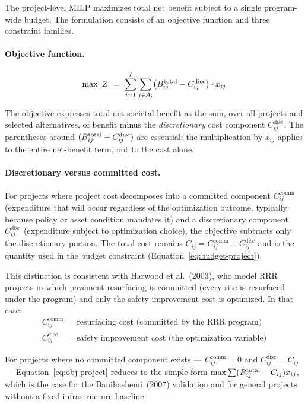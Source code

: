 The project-level MILP maximizes total net benefit subject to a single
program-wide budget. The formulation consists of an objective function and
three constraint families.

\paragraph{Objective function.}
\begin{equation}
\max\ Z\ =\ \sum_{i=1}^{I} \sum_{j \in A_i} \bigl( B^{\mathrm{total}}_{ij} - C_{ij}^{\mathrm{disc}} \bigr) \cdot x_{ij}
\label{eq:obj-project}
\end{equation}

The objective expresses total net societal benefit as the sum, over all
projects and selected alternatives, of benefit minus the
\emph{discretionary} cost component $C_{ij}^{\mathrm{disc}}$. The
parentheses around $(B^{\mathrm{total}}_{ij} - C_{ij}^{\mathrm{disc}})$ are essential:
the multiplication by $x_{ij}$ applies to the entire net-benefit term,
not to the cost alone.

\paragraph{Discretionary versus committed cost.} For projects where
project cost decomposes into a committed component $C_{ij}^{\mathrm{comm}}$
(expenditure that will occur regardless of the optimization outcome,
typically because policy or asset condition mandates it) and a
discretionary component $C_{ij}^{\mathrm{disc}}$ (expenditure subject to
optimization choice), the objective subtracts only the discretionary
portion. The total cost remains $C_{ij} = C_{ij}^{\mathrm{comm}} +
C_{ij}^{\mathrm{disc}}$ and is the quantity used in the budget
constraint (Equation~\ref{eq:budget-project}).

This distinction is consistent with Harwood et al.~(2003), who model
RRR projects in which pavement resurfacing is committed (every site is
resurfaced under the program) and only the safety improvement cost is
optimized. In that case:
\begin{align*}
C_{ij}^{\mathrm{comm}} &= \text{resurfacing cost (committed by the RRR program)} \\
C_{ij}^{\mathrm{disc}} &= \text{safety improvement cost (the optimization variable)}
\end{align*}

For projects where no committed component exists ---
$C_{ij}^{\mathrm{comm}} = 0$ and $C_{ij}^{\mathrm{disc}} = C_{ij}$ ---
Equation~\ref{eq:obj-project} reduces to the simple form
$\max \sum (B^{\mathrm{total}}_{ij} - C_{ij}) x_{ij}$, which is the case for the
Banihashemi~(2007) validation and for general projects without a fixed
infrastructure baseline.

